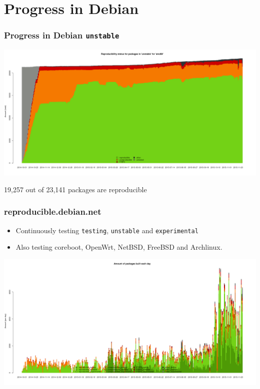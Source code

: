 \documentclass[14pt,aspectratio=169]{beamer}
\begin{document}
\section{Progress in Debian}

\begin{frame}[plain]
 \frametitle{Progress in Debian \texttt{unstable}}
 \begin{center}
  \includegraphics[height=0.73\paperheight]{images/stats_pkg_state.png}

  \footnotesize{19,257 out of 23,141 packages are reproducible}
  \vfill
 \end{center}
\end{frame}

\begin{frame}
 \frametitle{reproducible.debian.net}

 \begin{itemize}
  \item Continuously testing \texttt{testing}, \texttt{unstable} and \texttt{experimental}
  \item Also testing coreboot, OpenWrt, NetBSD, FreeBSD and Archlinux.
 \end{itemize}
 \vfill
 \begin{center}
  \includegraphics[height=0.47\paperheight]{images/stats_builds_per_day_amd64.png}
 \end{center}
\end{frame}
\end{document}
